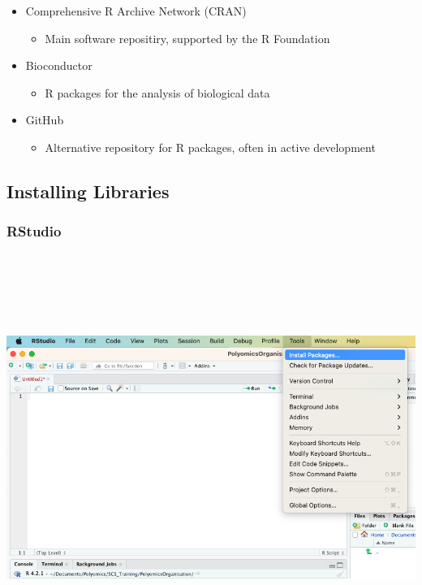 \documentclass[
  letterpaper,
  DIV=11,
  numbers=noendperiod,
  landscape]{scrartcl}
\providecommand{\tightlist}{%
  \setlength{\itemsep}{0pt}\setlength{\parskip}{0pt}}\usepackage{longtable,booktabs,array}
\begin{document}
\begin{itemize}
\tightlist
\item
  Comprehensive R Archive Network (CRAN)

  \begin{itemize}
  \tightlist
  \item
    Main software repositiry, supported by the R Foundation
  \end{itemize}
\item
  Bioconductor

  \begin{itemize}
  \tightlist
  \item
    R packages for the analysis of biological data
  \end{itemize}
\item
  GitHub

  \begin{itemize}
  \tightlist
  \item
    Alternative repository for R packages, often in active development
  \end{itemize}
\end{itemize}

\hypertarget{installing-libraries}{%
\subsection{Installing Libraries}\label{installing-libraries}}

\hypertarget{rstudio-4}{%
\subsubsection{RStudio}\label{rstudio-4}}

\includegraphics[width=\textwidth,height=5.20833in]{images/RStudio_tools.png}
\end{document}
